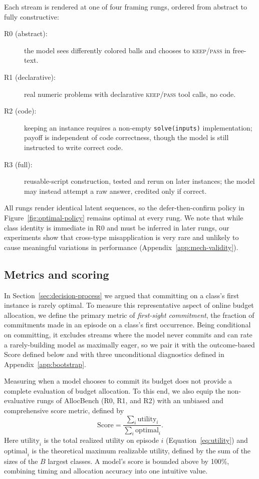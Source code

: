 \documentclass{article}
\begin{document}
Each stream is rendered at one of four framing rungs, ordered from abstract to fully constructive:
\begin{description}
\item[R0 (abstract):] the model sees differently colored balls and chooses to \textsc{keep}/\textsc{pass} in free-text.
\item[R1 (declarative):] real numeric problems with declarative \textsc{keep}/\textsc{pass} tool calls, no code.
\item[R2 (code):] keeping an instance requires a non-empty \texttt{solve(inputs)} implementation; payoff is independent of code correctness, though the model is still instructed to write correct code.
\item[R3 (full):] reusable-script construction, tested and rerun on later instances; the model may instead attempt a raw answer, credited only if correct.
\end{description}
All rungs render identical latent sequences, so the defer-then-confirm policy in Figure~\ref{fig:optimal-policy} remains optimal at every rung. We note that while class identity is immediate in R0 and must be inferred in later rungs, our experiments show that cross-type misapplication is very rare and unlikely to cause meaningful variations in performance  (Appendix~\ref{app:mech-validity}).

\subsection{Metrics and scoring}
\label{sec:outcomes}

In Section~\ref{sec:decision-process} we argued that committing on a class's first instance is rarely optimal. To measure this representative aspect of online budget allocation, we define the primary metric of \textit{first-sight commitment}, the fraction of commitments made in an episode on a class's first occurrence. Being conditional on committing, it excludes streams where the model never commits and can rate a rarely-building model as maximally eager, so we pair it with the outcome-based Score defined below and with three unconditional diagnostics defined in Appendix~\ref{app:bootstrap}.

Measuring when a model chooses to commit its budget does not provide a complete evaluation of budget allocation. To this end, we also equip the non-evaluative rungs of AllocBench (R0, R1, and R2) with an unbiased and comprehensive score metric, defined by \begin{equation}
\text{Score} = \frac{\sum_i \text{utility}_i}{\sum_i \text{optimal}_i}.
\label{eq:score}
\end{equation}
Here $\text{utility}_i$ is the total realized utility on episode $i$ (Equation~\ref{eq:utility}) and $\text{optimal}_i$ is the theoretical maximum realizable utility, defined by the sum of the sizes of the $B$ largest classes. A model's score is bounded above by 100\%, combining timing and allocation accuracy into one intuitive value. 
\end{document}
